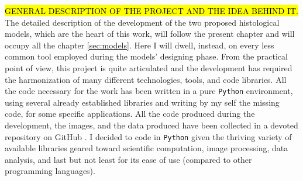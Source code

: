 \hl{GENERAL DESCRIPTION OF THE PROJECT AND THE IDEA BEHIND IT.}
The detailed description of the development of the two proposed histological models, which are the heart of this work, will follow the present chapter and will occupy all the chapter \ref{sec:models}. Here I will dwell, instead, on every less common tool employed during the models' designing phase. From the practical point of view, this project is quite articulated and the development has required the harmonization of many different technologies, tools, and code libraries.
All the code necessary for the work has been written in a pure \texttt{Python} environment, using several already established libraries and writing by my self the missing code, for some specific applications. All the code produced during the development, the images, and the data produced have been collected in a devoted repository on GitHub \cite{repo}. I decided to code in \texttt{Python} given the thriving variety of available libraries geared toward scientific computation, image processing, data analysis, and last but not least for its ease of use (compared to other programming languages).
